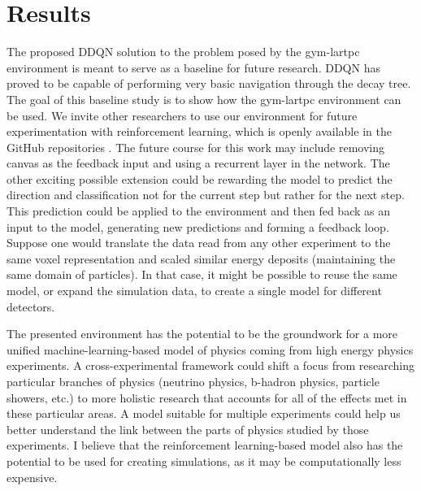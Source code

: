 \section{Results}
The proposed DDQN solution to the problem posed by the gym-lartpc environment is meant to serve as a baseline for future research. DDQN has proved to be capable of performing very basic navigation through the decay tree. The goal of this baseline study is to show how the gym-lartpc environment can be used.
We invite other researchers to use our environment for future experimentation with reinforcement learning, which is openly available in the GitHub repositories\cite{gymlartpc} \cite{dqn_lartpc}.
The future course for this work may include removing canvas as the feedback input and using a recurrent layer in the network.
The other exciting possible extension could be rewarding the model to predict the direction and classification not for the current step but rather for the next step. This prediction could be applied to the environment and then fed back as an input to the model, generating new predictions and forming a feedback loop.
Suppose one would translate the data read from any other experiment to the same voxel representation and scaled similar energy deposits (maintaining the same domain of particles). In that case, it might be possible to reuse the same model, or expand the simulation data, to create a single model for different detectors.

The presented environment has the potential to be the groundwork for a more unified machine-learning-based model of physics coming from high energy physics experiments.
A cross-experimental framework could shift a focus from researching particular branches of physics (neutrino physics, b-hadron physics, particle showers, etc.) to more holistic research that accounts for all of the effects met in these particular areas.
A model suitable for multiple experiments could help us better understand the link between the parts of physics studied by those experiments.
I believe that the reinforcement learning-based model also has the potential to be used for creating simulations, as it may be computationally less expensive.

